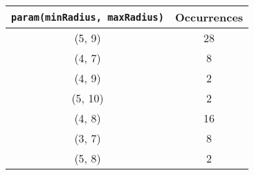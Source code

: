 \documentclass[letterpaper, 12pt]{article}
\begin{document}
\begin{longtable}{|c|c|}
\hline
\textbf{\texttt{param(minRadius, maxRadius)}} & \textbf{Occurrences} \\
\hline
(5, 9) & 28 \\
\hline
(4, 7) & 8 \\
\hline
(4, 9) & 2 \\
\hline
(5, 10) & 2 \\
\hline
(4, 8) & 16 \\
\hline
(3, 7) & 8 \\
\hline
(5, 8) & 2 \\
\hline
\end{longtable}
\end{document}
